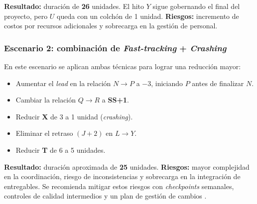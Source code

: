 \textbf{Resultado:} duración de \textbf{26} unidades. El hito \(Y\) sigue gobernando el final del proyecto, pero \(U\) queda con un colchón de 1 unidad.  
\textbf{Riesgos:} incremento de costos por recursos adicionales y sobrecarga en la gestión de personal.

\subsubsection*{Escenario 2: combinación de \emph{Fast-tracking} + \emph{Crashing}}

En este escenario se aplican ambas técnicas para lograr una reducción mayor:

\begin{itemize}
    \item Aumentar el \emph{lead} en la relación \(N \rightarrow P\) a \(-3\), iniciando \(P\) antes de finalizar \(N\).
    \item Cambiar la relación \(Q \rightarrow R\) a \textbf{SS+1}.
    \item Reducir \textbf{X} de 3 a 1 unidad (\emph{crashing}).
    \item Eliminar el retraso \((J{+}2)\) en \(L \rightarrow Y\).
    \item Reducir \textbf{T} de 6 a 5 unidades.
\end{itemize}

\textbf{Resultado:} duración aproximada de \textbf{25} unidades.  
\textbf{Riesgos:} mayor complejidad en la coordinación, riesgo de inconsistencias y sobrecarga en la integración de entregables.  
Se recomienda mitigar estos riesgos con \emph{checkpoints} semanales, controles de calidad intermedios y un plan de gestión de cambios \cite{PMBOK,Kerzner2017}.


